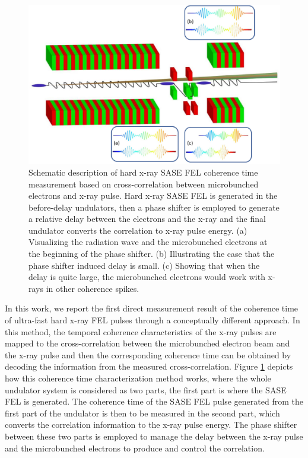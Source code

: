 \documentclass[%
 preprint,
 amsmath,amssymb,
 aps,
 prl,
 superscriptaddress,
 floatfix,
 letter,
]{revtex4-1}
\begin{document}
\begin{figure}[htp]
        \centering
        \includegraphics[width=18cm,angle=0]{fancyplot.eps}
        \caption{\label{fancyplot} Schematic description of hard x-ray SASE FEL coherence time measurement based on cross-correlation between microbunched electrons and x-ray pulse. Hard x-ray SASE FEL is generated in the before-delay undulators, then a phase shifter is employed to generate a relative delay between the electrons and the x-ray and the final undulator converts the correlation to x-ray pulse energy. (a) Visualizing the radiation wave and the microbunched electrons at the beginning of the phase shifter. (b) Illustrating the case that the phase shifter induced delay is small. (c) Showing that when the delay is quite large, the microbunched electrons would work with x-rays in other coherence spikes.}
        
\end{figure}

In this work, we report the first direct measurement result of the coherence time of ultra-fast hard x-ray FEL pulses through a conceptually different approach. In this method, the temporal coherence characteristics of the x-ray pulses are mapped to the cross-correlation between the microbunched electron beam and the x-ray pulse and then the corresponding coherence time can be obtained by decoding the information from the measured cross-correlation. Figure \ref{fancyplot} depicts how this coherence time characterization method works, where the whole undulator system is considered as two parts, the first part is where the SASE FEL is generated. The coherence time of the SASE FEL pulse generated from the first part of the undulator is then to be measured in the second part, which converts the correlation information to the x-ray pulse energy. The phase shifter between these two parts is employed to manage the delay between the x-ray pulse and the microbunched electrons to produce and control the correlation.
\end{document}
